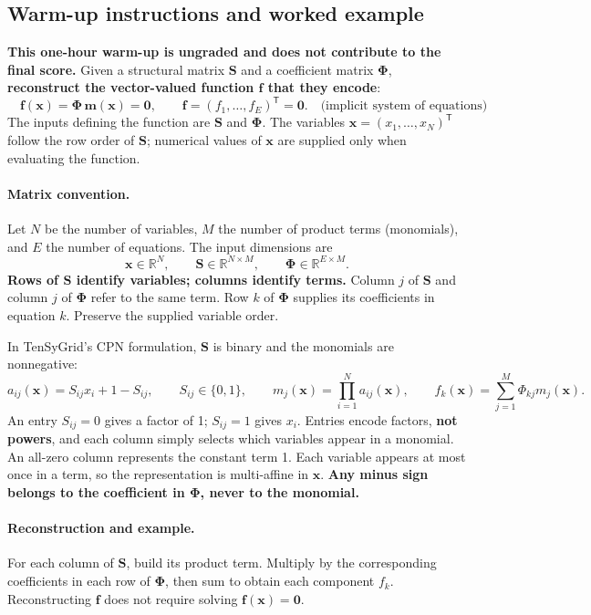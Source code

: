 \documentclass[11pt,a4paper]{article}
\begin{document}
\subsection{Warm-up instructions and worked example}\label{sec:warmup}
\textbf{This one-hour warm-up is ungraded and does not contribute to the final score.}
Given a structural matrix $\mathbf{S}$ and a coefficient matrix $\boldsymbol{\Phi}$,
\textbf{reconstruct the vector-valued function $\mathbf f$ that they encode}:
\[
 \boxed{\quad \mathbf f(\mathbf x)=\boldsymbol{\Phi}\,\mathbf m(\mathbf x)=\mathbf{0},\qquad
 \mathbf f=(f_1,\ldots,f_E)^\mathsf T=\mathbf{0}.\quad\textrm{(implicit system of equations)}\quad}
\]
The inputs defining the function are $\mathbf{S}$ and $\boldsymbol{\Phi}$. The variables
$\mathbf x=(x_1,\ldots,x_N)^\mathsf T$ follow the row order of $\mathbf{S}$;
numerical values of $\mathbf x$ are supplied only when evaluating the function.

\paragraph{Matrix convention.}
Let $N$ be the number of variables, $M$ the number of product terms (monomials), and $E$ the
number of equations. The input dimensions are
\[
 \mathbf x\in\mathbb R^N,\qquad \mathbf{S}\in\mathbb R^{N\times M},\qquad
 \boldsymbol{\Phi}\in\mathbb R^{E\times M}.
\]
\textbf{Rows of $\mathbf{S}$ identify variables; columns identify terms.} Column $j$ of
$\mathbf{S}$ and column $j$ of $\boldsymbol{\Phi}$ refer to the same term. Row $k$ of $\boldsymbol{\Phi}$ supplies
its coefficients in equation $k$. Preserve the supplied variable order.

In TenSyGrid's CPN formulation, $\mathbf{S}$ is binary and the monomials are nonnegative:
\[
 a_{ij}(\mathbf x)=S_{ij}x_i+1-S_{ij},\qquad S_{ij}\in\{0,1\},
 \qquad m_j(\mathbf x)=\prod_{i=1}^{N}a_{ij}(\mathbf x),\qquad
 f_k(\mathbf x)=\sum_{j=1}^{M}\Phi_{kj}m_j(\mathbf x).
\]
An entry $S_{ij}=0$ gives a factor of 1; $S_{ij}=1$ gives $x_i$.
Entries encode factors, \textbf{not powers}, and each column simply selects
which variables appear in a monomial. An all-zero column represents the
constant term 1. Each variable appears at most once in a term, so the
representation is multi-affine in $\mathbf x$. \textbf{Any minus sign belongs to
the coefficient in $\boldsymbol{\Phi}$, never to the monomial.}

\paragraph{Reconstruction and example.}
For each column of $\mathbf{S}$, build its product term. Multiply by the corresponding
coefficients in each row of $\boldsymbol{\Phi}$, then sum to obtain each component $f_k$. Reconstructing $\mathbf f$ does not
require solving $\mathbf f(\mathbf x)=\mathbf 0$.
\end{document}
